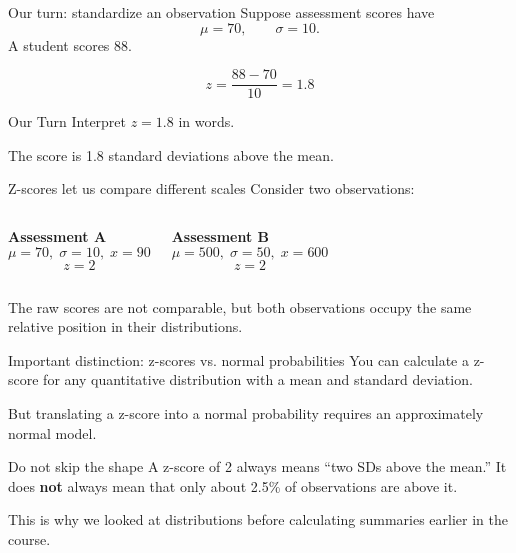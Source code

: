 \documentclass[11pt,aspectratio=169]{beamer}
\newcommand{\ourturn}[1]{%
\begin{center}
\begin{minipage}{0.90\textwidth}
\begin{block}{Our Turn}
#1
\end{block}
\end{minipage}
\end{center}}
\begin{document}
\begin{frame}{Our turn: standardize an observation}
Suppose assessment scores have
\[
\mu=70,\qquad \sigma=10.
\]
A student scores 88.

\[
z=\frac{88-70}{10}=\boxed{1.8}
\]

\ourturn{Interpret $z=1.8$ in words.}

\pause
The score is \alert{1.8 standard deviations above the mean}.
\end{frame}

\begin{frame}{Z-scores let us compare different scales}
Consider two observations:

\begin{columns}[T,onlytextwidth]
\textbf{Assessment A}
\[
\mu=70,\;\sigma=10,\;x=90
\]
\[
z=2
\]

\textbf{Assessment B}
\[
\mu=500,\;\sigma=50,\;x=600
\]
\[
z=2
\]
\end{columns}

\vfill
The raw scores are not comparable, but both observations occupy the same relative position in their distributions.
\end{frame}

\begin{frame}{Important distinction: z-scores vs. normal probabilities}
You can calculate a z-score for \alert{any} quantitative distribution with a mean and standard deviation.

\vspace{0.7em}
But translating a z-score into a normal probability requires an approximately normal model.

\begin{alertblock}{Do not skip the shape}
A z-score of 2 always means ``two SDs above the mean.'' It does \textbf{not} always mean that only about 2.5\% of observations are above it.
\end{alertblock}

\vfill
This is why we looked at distributions before calculating summaries earlier in the course.
\end{frame}
\end{document}
